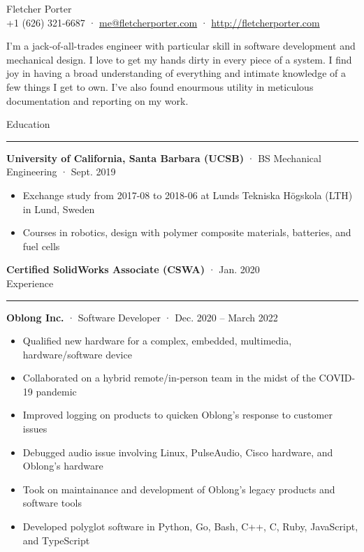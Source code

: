 \documentclass[12pt, oneside]{article}
\newcommand{\titlestyle}[1] {
	{\fontsize{40pt}{1em}\selectfont \textcolor{new_red}{\textsf{#1}}} \\
}
\newcommand{\headingstyleJobs}[1] {
	{\fontsize{18pt}{1em}\selectfont \textcolor{new_red}{\textsf{#1}}}
	\textcolor{new_red}{\rule{3.25in}{0.5pt}} \vspace{3pt}
}
\newcommand{\infostyle}[1] {
	{\selectfont #1} \\ %
}
\newcommand{\jobtitle}[3] {
	{\bf #1} · {#2} · {#3} \vspace{-7pt} \\
}
\newcommand{\certification}[2] {
	{\bf #1} · {#2} \vspace{5pt} \\
}
\renewenvironment{quote}{%
  \list{}{%
    \leftmargin4pt
    \rightmargin\leftmargin
  }
  \item\relax
}
{\endlist}
\newcommand{\overview}[1] {
	\begin{quote}
		#1
	\end{quote}
}
\begin{document}
\begin{flushleft}



\titlestyle{Fletcher Porter}
\infostyle{+1 (626) 321-6687 · \href{mailto:me@fletcherporter.com}{me@fletcherporter.com} · \url{http://fletcherporter.com}}

\overview{
I'm a jack-of-all-trades engineer with particular skill in software
development and mechanical design.  I love to get my hands dirty in every piece
of a system.  I find joy in having a broad understanding of everything and
intimate knowledge of a few things I get to own.  I've also found enourmous
utility in meticulous documentation and reporting on my work.
}

\headingstyleJobs{Education}

\jobtitle{University of California, Santa Barbara (UCSB)}{BS Mechanical Engineering}{Sept. 2019}
\begin{itemize}
	\item Exchange study from 2017-08 to 2018-06 at Lunds Tekniska Högskola (LTH) in Lund, Sweden \\
	\item Courses in robotics, design with polymer composite materials, batteries, and fuel cells
\end{itemize}


\certification{Certified SolidWorks Associate (CSWA)}{Jan. 2020}


\headingstyleJobs{Experience}

\jobtitle{Oblong Inc.}{Software Developer}{Dec. 2020 – March 2022}
\begin{itemize}
	\item Qualified new hardware for a complex, embedded, multimedia, hardware/software device \\
	\item Collaborated on a hybrid remote/in-person team in the midst of the COVID-19 pandemic \\
	\item Improved logging on products to quicken Oblong's response to customer issues \\
	\item Debugged audio issue involving Linux, PulseAudio, Cisco hardware, and Oblong's hardware \\
	\item Took on maintainance and development of Oblong's legacy products and  software tools \\
	\item Developed polyglot software in Python, Go, Bash, C++, C, Ruby, JavaScript, and TypeScript \\
\end{itemize}


\end{flushleft}
\end{document}
